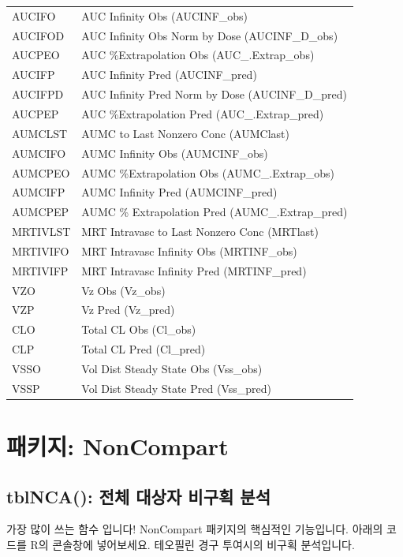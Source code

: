 \documentclass[9pt,]{krantz}
\begin{document}
\begin{longtable}{ll}
AUCIFO & AUC Infinity Obs (AUCINF\_obs)\\
AUCIFOD & AUC Infinity Obs Norm by Dose (AUCINF\_D\_obs)\\
\addlinespace
AUCPEO & AUC \%Extrapolation Obs (AUC\_.Extrap\_obs)\\
AUCIFP & AUC Infinity Pred (AUCINF\_pred)\\
AUCIFPD & AUC Infinity Pred Norm by Dose (AUCINF\_D\_pred)\\
AUCPEP & AUC \%Extrapolation Pred (AUC\_.Extrap\_pred)\\
AUMCLST & AUMC to Last Nonzero Conc (AUMClast)\\
\addlinespace
AUMCIFO & AUMC Infinity Obs (AUMCINF\_obs)\\
AUMCPEO & AUMC \%Extrapolation Obs (AUMC\_.Extrap\_obs)\\
AUMCIFP & AUMC Infinity Pred (AUMCINF\_pred)\\
AUMCPEP & AUMC \% Extrapolation Pred (AUMC\_.Extrap\_pred)\\
MRTIVLST & MRT Intravasc to Last Nonzero Conc (MRTlast)\\
\addlinespace
MRTIVIFO & MRT Intravasc Infinity Obs (MRTINF\_obs)\\
MRTIVIFP & MRT Intravasc Infinity Pred (MRTINF\_pred)\\
VZO & Vz Obs (Vz\_obs)\\
VZP & Vz Pred (Vz\_pred)\\
CLO & Total CL Obs (Cl\_obs)\\
\addlinespace
CLP & Total CL Pred (Cl\_pred)\\
VSSO & Vol Dist Steady State Obs (Vss\_obs)\\
VSSP & Vol Dist Steady State Pred (Vss\_pred)\\
\bottomrule
\end{longtable}

\hypertarget{noncompart}{%
\chapter{패키지: NonCompart}\label{noncompart}}

\hypertarget{tblnca----}{%
\section{tblNCA(): 전체 대상자 비구획 분석}\label{tblnca----}}

가장 많이 쓰는 함수 입니다!
NonCompart 패키지의 핵심적인 기능입니다.
아래의 코드를 R의 콘솔창에 넣어보세요.
테오필린 경구 투여시의 비구획 분석입니다.
\end{document}
